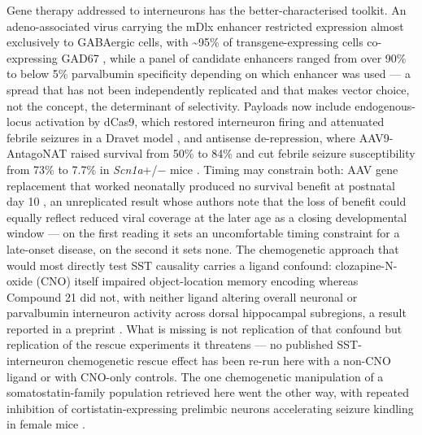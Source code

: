 \documentclass[11pt]{article}
\begin{document}
Gene therapy addressed to interneurons has the better-characterised toolkit. An adeno-associated virus carrying the mDlx enhancer restricted expression almost exclusively to GABAergic cells, with \textasciitilde{}95\% of transgene-expressing cells co-expressing GAD67 \citep{Dimidschstein2016}, while a panel of candidate enhancers ranged from over 90\% to below 5\% parvalbumin specificity depending on which enhancer was used \citep{VormsteinSchneider2020} --- a spread that has not been independently replicated and that makes vector choice, not the concept, the determinant of selectivity. Payloads now include endogenous-locus activation by dCas9, which restored interneuron firing and attenuated febrile seizures in a Dravet model \citep{Colasante2020}, and antisense de-repression, where AAV9-AntagoNAT raised survival from 50\% to 84\% and cut febrile seizure susceptibility from 73\% to 7.7\% in \emph{Scn1a}+/$-$ mice \citep{Diaz2026}. Timing may constrain both: AAV gene replacement that worked neonatally produced no survival benefit at postnatal day 10 \citep{Chen2025b}, an unreplicated result whose authors note that the loss of benefit could equally reflect reduced viral coverage at the later age as a closing developmental window --- on the first reading it sets an uncomfortable timing constraint for a late-onset disease, on the second it sets none. The chemogenetic approach that would most directly test SST causality carries a ligand confound: clozapine-N-oxide (CNO) itself impaired object-location memory encoding whereas Compound 21 did not, with neither ligand altering overall neuronal or parvalbumin interneuron activity across dorsal hippocampal subregions, a result reported in a preprint \citep{Bunce2026}. What is missing is not replication of that confound but replication of the rescue experiments it threatens --- no published SST-interneuron chemogenetic rescue effect has been re-run here with a non-CNO ligand or with CNO-only controls. The one chemogenetic manipulation of a somatostatin-family population retrieved here went the other way, with repeated inhibition of cortistatin-expressing prelimbic neurons accelerating seizure kindling in female mice \citep{Salisbury2026}.
\end{document}
